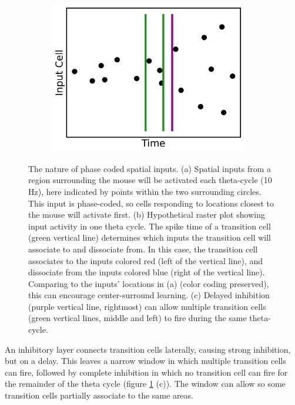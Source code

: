 \documentclass{article}
\begin{document}
\begin{figure}[htbp]
\begin{minipage}[b]{0.38\textwidth}
            
            \begin{subfigure}{\textwidth}
                \subcaption{}
                \includegraphics[width=0.95\textwidth]{input_inhibit_plot.png}
            \end{subfigure}
        \end{minipage}%
        
        \caption{The nature of phase coded spatial inputs. (a) Spatial inputs from a region surrounding the mouse will be activated each theta-cycle (10 Hz), here indicated by points within the two surrounding circles. This input is phase-coded, so cells responding to locations closest to the mouse will activate first. (b) Hypothetical raster plot showing input activity in one theta cycle. The spike time of a transition cell (green vertical line) determines which inputs the transition cell will associate to and dissociate from. In this case, the transition cell associates to the inputs colored red (left of the vertical line), and dissociate from the inputs colored blue (right of the vertical line). Comparing to the inputs' locations in (a) (color coding preserved), this can encourage center-surround learning. (c) Delayed inhibition (purple vertical line, rightmost) can allow multiple transition cells (green vertical lines, middle and left) to fire during the same theta-cycle.}
        
        \label{mouse_plot}
    \end{figure}

    An inhibitory layer connects transition cells laterally, causing strong inhibition, but on a delay. This leaves a narrow window in which multiple transition cells can fire, followed by complete inhibition in which no transition cell can fire for the remainder of the theta cycle (figure \ref{mouse_plot} (c)). The window can allow so some transition cells partially associate to the same areas.
\end{document}
